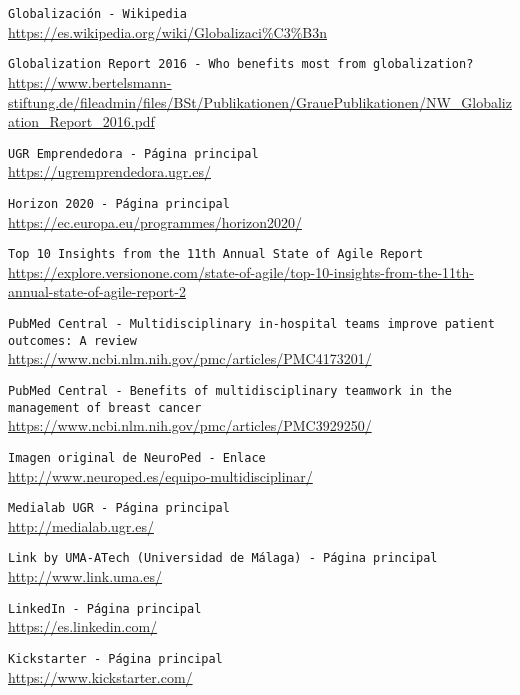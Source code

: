 
 {\tt Globalización - Wikipedia}\\
\url{https://es.wikipedia.org/wiki/Globalizaci%C3%B3n}

 {\tt Globalization Report 2016 - Who benefits most from globalization?}\\
\url{https://www.bertelsmann-stiftung.de/fileadmin/files/BSt/Publikationen/GrauePublikationen/NW_Globalization_Report_2016.pdf}

 {\tt UGR Emprendedora - Página principal}\\
\url{https://ugremprendedora.ugr.es/}

 {\tt Horizon 2020 - Página principal}\\
\url{https://ec.europa.eu/programmes/horizon2020/}

 {\tt Top 10 Insights from the 11th Annual State of Agile Report}\\
\url{https://explore.versionone.com/state-of-agile/top-10-insights-from-the-11th-annual-state-of-agile-report-2}

 {\tt PubMed Central - Multidisciplinary in-hospital teams improve patient outcomes: A review}\\
\url{https://www.ncbi.nlm.nih.gov/pmc/articles/PMC4173201/}

 {\tt PubMed Central - Benefits of multidisciplinary teamwork in the management of breast cancer}\\
\url{https://www.ncbi.nlm.nih.gov/pmc/articles/PMC3929250/}

 {\tt Imagen original de NeuroPed - Enlace}\\
\url{http://www.neuroped.es/equipo-multidisciplinar/}

 {\tt Medialab UGR - Página principal}\\
\url{http://medialab.ugr.es/}

 {\tt Link by UMA-ATech (Universidad de Málaga) - Página principal}\\
\url{http://www.link.uma.es/}

 {\tt LinkedIn - Página principal}\\
\url{https://es.linkedin.com/}

 {\tt Kickstarter - Página principal}\\
\url{https://www.kickstarter.com/}

